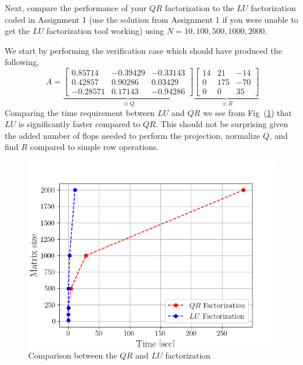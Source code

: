 Next, compare the performance of your $QR$ factorization to the $LU$
factorization coded in Assignment 1 (use the solution from Assignment 1 if
you were unable to get the $LU$ factorization tool working) using $N = 10,
100, 500, 1000, 2000$.
\begin{mdframed}[style=MyFrame]
    We start by performing the verification case which should have
    produced the following, 
    \begin{equation}
        A = 
        \underbrace{
        \begin{bmatrix}
            0.85714     &    -0.39429       &   -0.33143    \\
            0.42857     &    0.90286        &    0.03429    \\
            -0.28571    &    0.17143        &  -0.94286
        \end{bmatrix}
        }_{\equiv Q}
        \underbrace{
        \begin{bmatrix}
            14      &   21      &           -14         \\
            0       &   175     &           -70         \\
            0       &   0       &           35
        \end{bmatrix}
        }_{\equiv R}
    \end{equation}
    Comparing the time requirement between $LU$ and $QR$ we see from
    Fig~(\ref{fig:QR-LU}) that $LU$ is significantly faster compared to
    $QR$. This should not be surprising given the added number of flops
    needed to perform the projection, normalize $Q$, and find $R$ compared
    to simple row operations.
    \begin{figure}[H]
        \includegraphics[height=0.35\textheight]{../media/QR-LU.png}
        \caption{Comparison between the $QR$ and $LU$ factorization}
        \label{fig:QR-LU}
    \end{figure}

\end{mdframed}
